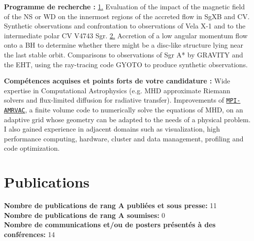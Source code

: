 \documentclass[11pt]{article}
\begin{document}
\vspace{-0.1cm}

{\bf Programme de recherche :}  
\underline{1.} Evaluation of the impact of the magnetic field of the NS or WD on the innermost regions of the accreted flow in SgXB and CV. Synthetic observations and confrontation to observations of Vela X-1 and to the intermediate polar CV V4743 Sgr. \underline{2.} Accretion of a low angular momentum flow onto a BH to determine whether there might be a disc-like structure lying near the last stable orbit. Comparisons to observations of Sgr A* by GRAVITY and the EHT, using the ray-tracing code GYOTO to produce synthetic observations.\\

\vspace{-0.1cm}

{\bf Comp\'etences acquises et points forts de votre candidature :}  
Wide expertise in Computational Astrophysics (e.g. MHD approximate Riemann solvers and flux-limited diffusion for radiative transfer). Improvements of \href{http://amrvac.org/}{\texttt{MPI-AMRVAC}}, a finite volume code to numerically solve the equations of MHD, on an adaptive grid whose geometry can be adapted to the needs of a physical problem. I also gained experience in adjacent domains such as visualization, high performance computing, hardware, cluster and data management, profiling and code optimization.



\section*{Publications}
\vspace{0.3cm}

{\bf Nombre de publications de rang A publi\'ees et sous presse:} 11 \\
 
{\bf Nombre de publications de rang A soumises:} 0 \\

{\bf Nombre de communications et/ou de posters pr\'esent\'es \`a des
  conf\'erences:} 14 \\
  
\end{document}
